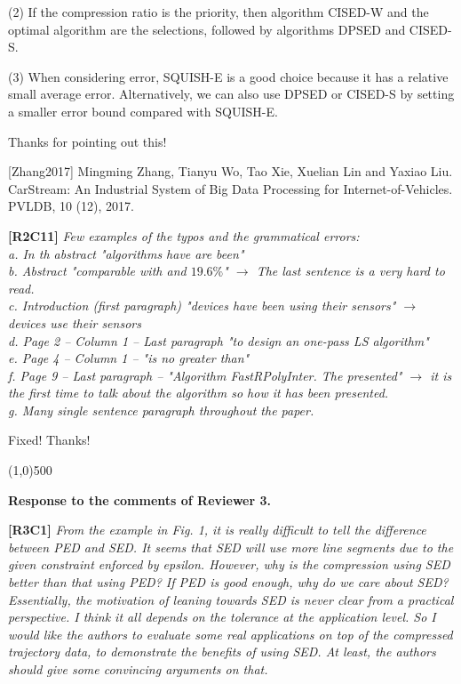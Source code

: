 \documentclass{letter}
\begin{document}
(2) If the compression ratio is the priority, then algorithm CISED-W and the optimal algorithm are the selections, followed by algorithms DPSED and CISED-S.

(3) When considering error, SQUISH-E is a good choice
because it has a relative small average error. Alternatively, we can also use DPSED or CISED-S by setting a
smaller error bound compared with SQUISH-E.




Thanks for pointing out this!

[Zhang2017] Mingming Zhang, Tianyu Wo, Tao Xie, Xuelian Lin and Yaxiao Liu. CarStream: An Industrial System of Big Data Processing for Internet-of-Vehicles. PVLDB, 10 (12), 2017.

\textbf{[R2C11]} \emph{Few examples of the typos and the grammatical errors: \\
   a. In th abstract "algorithms have are been"	\\
   b. Abstract "comparable with and $19.6\%$" $\rightarrow$ The last sentence is a very hard to read.	\\
   c. Introduction (first paragraph) "devices have been using their sensors" $\rightarrow$ devices use their sensors	\\
   d. Page 2 -- Column 1 -- Last paragraph "to design an one-pass LS algorithm" \\
   e. Page 4 -- Column 1 -- "is no greater than" \\
   f. Page 9 -- Last paragraph -- "Algorithm FastRPolyInter. The presented" $\rightarrow$ it is the first time to talk about the algorithm so how it has been presented. \\
   g. Many single sentence paragraph throughout the paper.
}

Fixed! Thanks!


\line(1,0){500}

\textbf{Response to the comments of Reviewer 3.}

\textbf{[R3C1]} \emph{From the example in Fig. 1, it is really difficult to tell the difference between PED and SED. It seems that SED will use more line segments due to the given constraint enforced by epsilon. However, why is the compression using SED better than that using PED? If PED is good enough, why do we care about SED? Essentially, the motivation of leaning towards SED is never clear from a practical perspective. I think it all depends on the tolerance at the application level. So I would like the authors to evaluate some real applications on top of the compressed trajectory data, to demonstrate the benefits of using SED. At least, the authors should give some convincing arguments on that.}
\end{document}
